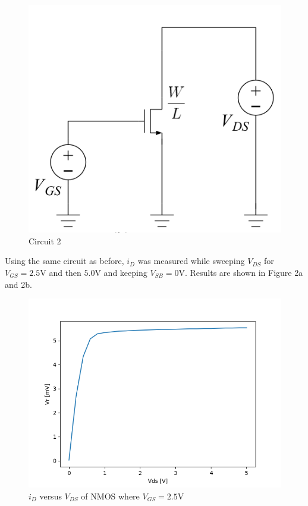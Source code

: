 \FloatBarrier

\begin{figure}[h!]
	\centering
	\includegraphics[scale=0.75]{./images/circuit_2.PNG}
	\caption{Circuit 2}
	\label{fig:circuit_2}
\end{figure}

\FloatBarrier

Using the same circuit as before, $i_{D}$ was measured while sweeping $V_{DS}$ for $V_{GS} = 2.5$\si{\volt} and then $5.0$\si{\volt} and keeping $V_{SB} = 0$\si{\volt}.
Results are shown in Figure 2a and 2b.

\begin{figure}[h!]
	\centering
	\includegraphics[scale=0.75]{./images/data_2.PNG}
	\caption{$i_{D}$ versus $V_{DS}$ of NMOS where $V_{GS}= 2.5$\si{\volt}}
	\label{fig:data_3}
\end{figure}
\FloatBarrier

